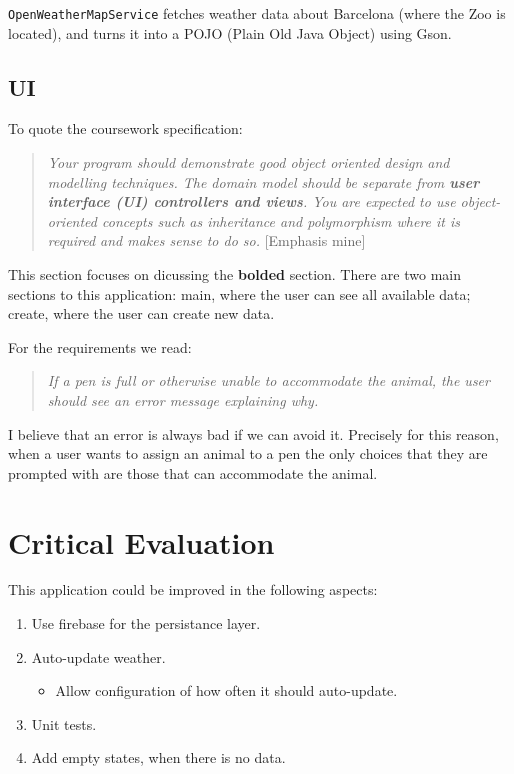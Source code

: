 \documentclass[english,a4paper,]{report}
\providecommand{\tightlist}{%
  \setlength{\itemsep}{0pt}\setlength{\parskip}{0pt}}
\begin{document}
\texttt{OpenWeatherMapService} fetches weather data about Barcelona
(where the Zoo is located), and turns it into a POJO (Plain Old Java
Object) using Gson.

\hypertarget{ui}{%
\section{UI}\label{ui}}

To quote the coursework specification:

\begin{quote}
\emph{Your program should demonstrate good object oriented design and
modelling techniques. The domain model should be separate from
\textbf{user interface (UI) controllers and views}. You are expected to
use object-oriented concepts such as inheritance and polymorphism where
it is required and makes sense to do so.} {[}Emphasis mine{]}
\end{quote}

This section focuses on dicussing the \textbf{bolded} section. There are
two main sections to this application: main, where the user can see all
available data; create, where the user can create new data.

For the requirements we read:

\begin{quote}
\emph{If a pen is full or otherwise unable to accommodate the animal,
the user should see an error message explaining why.}
\end{quote}

I believe that an error is always bad if we can avoid it. Precisely for
this reason, when a user wants to assign an animal to a pen the only
choices that they are prompted with are those that can accommodate the
animal.

\hypertarget{critical-evaluation}{%
\chapter{Critical Evaluation}\label{critical-evaluation}}

This application could be improved in the following aspects:

\begin{enumerate}
\def\labelenumi{\arabic{enumi}.}
\tightlist
\item
  Use firebase for the persistance layer.
\item
  Auto-update weather.

  \begin{itemize}
  \tightlist
  \item
    Allow configuration of how often it should auto-update.
  \end{itemize}
\item
  Unit tests.
\item
  Add empty states, when there is no data.
\end{enumerate}
\end{document}
